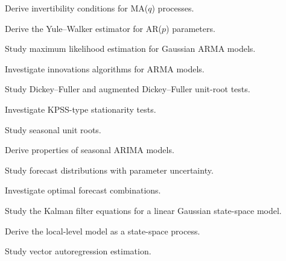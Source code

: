 \begin{exercise}[4]
Derive invertibility conditions for MA(\(q\)) processes.
\end{exercise}

\begin{exercise}[4]
Derive the Yule--Walker estimator for AR(\(p\)) parameters.
\end{exercise}

\begin{exercise}[4]
Study maximum likelihood estimation for Gaussian ARMA models.
\end{exercise}

\begin{exercise}[4]
Investigate innovations algorithms for ARMA models.
\end{exercise}

\begin{exercise}[4]
Study Dickey--Fuller and augmented Dickey--Fuller unit-root tests.
\end{exercise}

\begin{exercise}[4]
Investigate KPSS-type stationarity tests.
\end{exercise}

\begin{exercise}[4]
Study seasonal unit roots.
\end{exercise}

\begin{exercise}[4]
Derive properties of seasonal ARIMA models.
\end{exercise}

\begin{exercise}[4]
Study forecast distributions with parameter uncertainty.
\end{exercise}

\begin{exercise}[4]
Investigate optimal forecast combinations.
\end{exercise}

\begin{exercise}[4]
Study the Kalman filter equations for a linear Gaussian state-space
model.
\end{exercise}

\begin{exercise}[4]
Derive the local-level model as a state-space process.
\end{exercise}

\begin{exercise}[4]
Study vector autoregression estimation.
\end{exercise}

